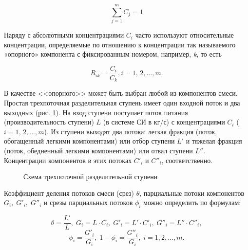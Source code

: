 \begin{equation} \label{GrindEQ__1_1_} 
  \sum _{j=1}^{m}C_{j}  =1 
\end{equation} 
  
Наряду с абсолютными концентрациями $C_{i} $ часто используют относительные концентрации, определяемые по отношению к концентрации так называемого «опорного» компонента с фиксированным номером, например, \textit{k}, то есть

\begin{equation} \label{GrindEQ__1_2_} 
  R_{ik} =\frac{C_{i} }{C_{k} } , i=1,\, 2,...,m.             
\end{equation} 
  
В качестве <<опорного>> может быть выбран любой из компонентов смеси. 
Простая трехпоточная разделительная ступень имеет один входной поток и два выходных (рис. \ref{1_1}). На вход ступени поступает поток питания (производительность ступени) $L$  (в системе СИ в кг/с) с концентрациями $C_{i}$ ($i=1,\, 2,...,m$). Из ступени выходят два потока: легкая фракция (поток, обогащенный легкими компонентами) или отбор ступени $L'$ и тяжелая фракция (поток, обедненный легкими компонентами) или отвал ступени $L''$. Концентрации компонентов в этих потоках  $C'_{i} $ и $C''_{i} $, соответственно.

\begin{figure}[ht]
  \caption{Схема трехпоточной разделительной ступени }\label{1_1}
\end{figure}

Коэффициент деления потоков смеси (срез) $\theta$, парциальные потоки компонентов $G_{i} ,\; G'_{i} ,\; G''_{i}$ и срезы парциальных потоков $\phi _{i}$ можно определить по формулам:

\begin{equation} \label{GrindEQ__1_3_} 
  \theta =\frac{L'}{L} ,\; G_{i} =L \cdot C_{i} ,\; G'_{i} =L' \cdot C'_{i} ,\; G''_{i} =L'' \cdot C''_{i} , 
  \end{equation} 
  \begin{equation} \label{GrindEQ__1_4_} 
  \phi _{i} =\frac{G'_{i} }{G_{i} } ,\; 1-\phi _{i} =\frac{G''_{i} }{G_{i} } ,\; i=1,2,...,m. 
  \end{equation} 

